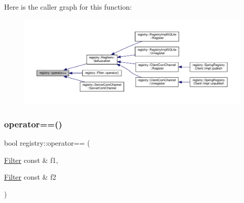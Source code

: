 Here is the caller graph for this function\+:
\nopagebreak
\begin{figure}[H]
\begin{center}
\leavevmode
\includegraphics[width=350pt]{namespaceregistry_a3aea015bffedea5734787cec200bfe1b_icgraph}
\end{center}
\end{figure}
\mbox{\label{namespaceregistry_af536cbf7e20589d15ebaef7741b96442}} 
\subsubsection{\texorpdfstring{operator==()}{operator==()}\hspace{0.1cm}{\footnotesize\ttfamily [3/3]}}
{\footnotesize\ttfamily bool registry\+::operator== (\begin{DoxyParamCaption}\item[{\hyperlink{classregistry_1_1Filter}{Filter} const \&}]{f1,  }\item[{\hyperlink{classregistry_1_1Filter}{Filter} const \&}]{f2 }\end{DoxyParamCaption})\hspace{0.3cm}{\ttfamily [inline]}}

